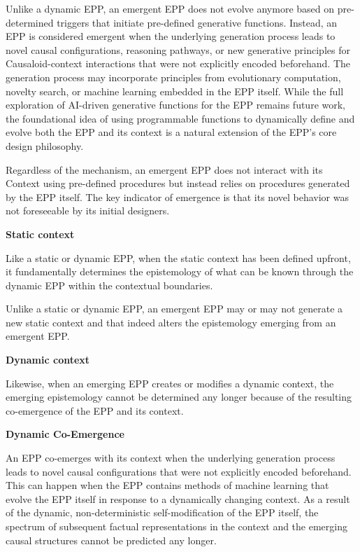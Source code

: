 Unlike a dynamic EPP, an emergent EPP does not evolve anymore based on pre-determined triggers that initiate pre-defined generative functions. Instead, an EPP is considered emergent when the underlying generation process leads to novel causal configurations, reasoning pathways, or new generative principles for Causaloid-context interactions that were not explicitly encoded beforehand.
The generation process may incorporate principles from evolutionary computation, novelty search, or machine learning embedded in the EPP itself. While the full exploration of AI-driven generative functions for the EPP remains future work, the foundational idea of using programmable functions to dynamically define and evolve both the EPP and its context is a natural extension of the EPP's core design philosophy.

Regardless of the mechanism, an emergent EPP does not interact with its Context using pre-defined procedures but instead relies on procedures generated by the EPP itself. The key indicator of emergence is that its novel behavior was not foreseeable by its initial designers.

\textbf{Static context}

Like a static or dynamic EPP, when the static context has been defined upfront, it fundamentally determines the epistemology of what can be known through the dynamic EPP within the contextual boundaries.

Unlike a static or dynamic EPP, an emergent EPP may or may not generate a new static context and that indeed alters the epistemology emerging from an emergent EPP.

\textbf{Dynamic context}

Likewise, when an emerging EPP creates or modifies a dynamic context, the emerging epistemology cannot be determined any longer because of the resulting co-emergence of the EPP and its context.

\textbf{Dynamic Co-Emergence}

An EPP co-emerges with its context when the underlying generation process leads to novel causal configurations that were not explicitly encoded beforehand. This can happen when the EPP contains methods of machine learning that evolve the EPP itself in response to a dynamically changing context. As a result of the dynamic, non-deterministic self-modification of the EPP itself, the spectrum of subsequent factual representations in the context and the emerging causal structures cannot be predicted any longer.


